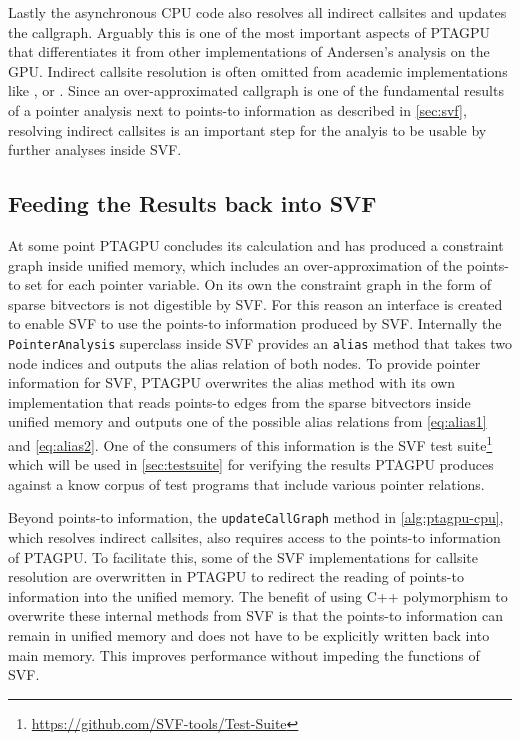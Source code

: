Lastly the asynchronous CPU code also resolves all indirect callsites and updates the callgraph. 
Arguably this is one of the most important aspects of PTAGPU that differentiates it from other implementations of Andersen's analysis on the GPU.
Indirect callsite resolution is often omitted from academic implementations like \cite{mendez2012gpu}, \cite{zuo2021systemizing} or \cite{su2014parallel}.
Since an over-approximated callgraph is one of the fundamental results of a pointer analysis next to points-to information as described in \autoref{sec:svf}, resolving indirect callsites is an important step for the analyis to be usable by further analyses inside SVF.
\subsection{Feeding the Results back into SVF}\label{sec:feedingback}
At some point PTAGPU concludes its calculation and has produced a constraint graph inside unified memory, which includes an over-approximation of the points-to set for each pointer variable.
On its own the constraint graph in the form of sparse bitvectors is not digestible by SVF. For this reason an interface is created to enable SVF to use the points-to information produced by SVF.
Internally the \verb|PointerAnalysis| superclass inside SVF provides an \verb|alias| method that takes two node indices and outputs the alias relation of both nodes.
To provide pointer information for SVF, PTAGPU overwrites the alias method with its own implementation that reads points-to edges from the sparse bitvectors inside unified memory and outputs one of the possible alias relations from \autoref{eq:alias1} and \autoref{eq:alias2}.
One of the consumers of this information is the SVF test suite\footnote{\url{https://github.com/SVF-tools/Test-Suite}} which will be used in \autoref{sec:testsuite} for verifying the results PTAGPU produces against a know corpus of test programs that include various pointer relations.

Beyond points-to information, the \verb|updateCallGraph| method in \autoref{alg:ptagpu-cpu}, which resolves indirect callsites, also requires access to the points-to information of PTAGPU. To facilitate this, some of the SVF implementations for callsite resolution are overwritten in PTAGPU to redirect the reading of points-to information into the unified memory.
The benefit of using C++ polymorphism to overwrite these internal methods from SVF is that the points-to information can remain in unified memory and does not have to be explicitly written back into main memory.
This improves performance without impeding the functions of SVF.

